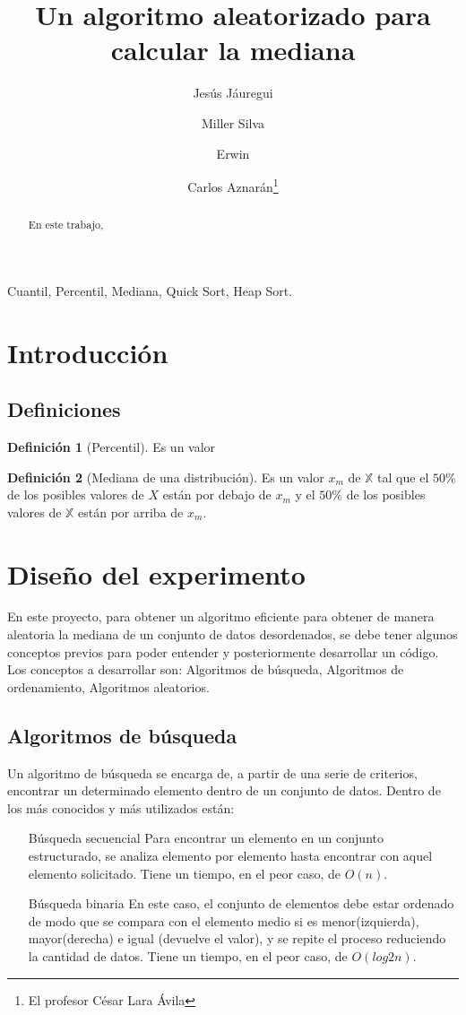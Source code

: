 \documentclass[9pt,draft,a4paper,twoside,onecolumn,romanappendices]{IEEEtran}\usepackage[]{graphicx}\usepackage[]{color}
\title{Un algoritmo aleatorizado para calcular la mediana}
\author{Jesús Jáuregui \and Miller Silva \and Erwin \and Carlos Aznarán\thanks{El profesor César Lara Ávila}}
\theoremstyle{definition}
\newtheorem{definition}{Definición}[subsection]
\begin{document}
\maketitle
\begin{abstract}
En este trabajo, 
\end{abstract}
\begin{IEEEkeywords}
Cuantil, Percentil, Mediana, Quick Sort, Heap Sort.
\end{IEEEkeywords}
\section{Introducción}

\subsection{Definiciones}

\begin{definition}[Percentil]
Es un valor
\end{definition}

\begin{definition}[Mediana de una distribución]
Es un valor $x_m$ de $\mathbb{X}$ tal que el $50\%$ de los posibles valores de $X$ están por debajo de $x_m$ y el $50\%$ de los posibles valores de $\mathbb{X}$ están por arriba de $x_m$.
\end{definition}

\section{Diseño del experimento}
En este proyecto, para obtener un algoritmo eficiente para obtener de manera aleatoria la mediana de un conjunto de datos desordenados, se debe tener algunos conceptos previos para poder entender y posteriormente desarrollar un código. Los conceptos a desarrollar son: Algoritmos de búsqueda, Algoritmos de ordenamiento, Algoritmos aleatorios.

\subsection{Algoritmos de búsqueda}
Un algoritmo de búsqueda se encarga de, a partir de una serie de criterios, encontrar un determinado elemento dentro de un conjunto de datos. Dentro de los más conocidos y más utilizados están:
\begin{itemize}
\item[Búsqueda secuencial] Para encontrar un elemento en un conjunto estructurado, se analiza elemento por elemento hasta encontrar con aquel elemento solicitado. Tiene un tiempo, en el peor caso, de $O(n)$.
\item[Búsqueda binaria] En este caso, el conjunto de elementos debe estar ordenado de modo que se compara con el elemento medio si es menor(izquierda), mayor(derecha) e igual (devuelve el valor), y se repite el proceso reduciendo la cantidad de datos. Tiene un tiempo, en el peor caso, de $O(log2n)$.
\end{itemize}
\end{document}
